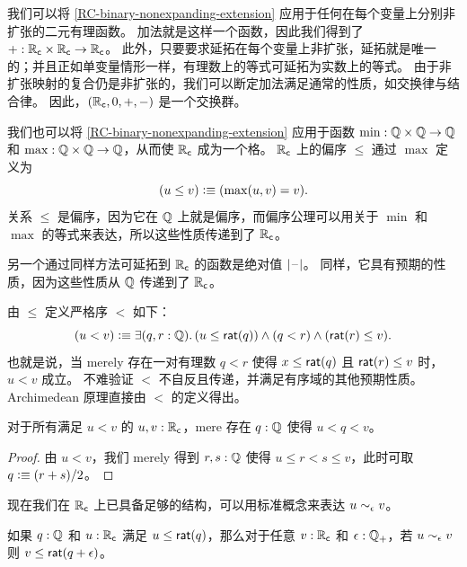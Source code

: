 我们可以将 \cref{RC-binary-nonexpanding-extension} 应用于任何在每个变量上分别非扩张的二元有理函数。
加法就是这样一个函数，因此我们得到了 ${+} : \mathbb{R}_\mathsf{c} \times \mathbb{R}_\mathsf{c} \to \mathbb{R}_\mathsf{c}$。
%
此外，只要要求延拓在每个变量上非扩张，延拓就是唯一的；并且正如单变量情形一样，有理数上的等式可延拓为实数上的等式。
由于非扩张映射的复合仍是非扩张的，我们可以断定加法满足通常的性质，如交换律与结合律。
%
因此，$(\mathbb{R}_\mathsf{c}, 0, {+}, {-})$ 是一个交换群。

我们也可以将 \cref{RC-binary-nonexpanding-extension} 应用于函数 $\min : \mathbb{Q} \times
\mathbb{Q} \to \mathbb{Q}$ 和 $\max : \mathbb{Q} \times \mathbb{Q} \to \mathbb{Q}$，从而使 $\RC$ 成为一个格。
$\RC$ 上的偏序 $\leq$ 通过 $\max$ 定义为
%
%
%
\begin{equation*}
  (u \leq v) \vcentcolon\equiv (\max(u, v) = v).
\end{equation*}
%
关系 $\leq$ 是偏序，因为它在 $\mathbb{Q}$ 上就是偏序，而偏序公理可以用关于 $\min$ 和 $\max$ 的等式来表达，所以这些性质传递到了 $\RC$。

%
另一个通过同样方法可延拓到 $\RC$ 的函数是绝对值 $|{\mathord{\hspace{1pt}\text{--}\hspace{1pt}}}|$。
同样，它具有预期的性质，因为这些性质从 $\mathbb{Q}$ 传递到了 $\RC$。

由 $\leq$ 定义严格序 $<$ 如下：
%
%
%
\begin{equation*}
  (u < v) \defeq \exis{q, r : \Q} (u \leq \rcrat(q)) \land (q < r) \land (\rcrat(r) \leq v).
\end{equation*}
%
也就是说，当 merely 存在一对有理数 $q < r$ 使得 $x \leq
\mathsf{rat}(q)$ 且 $\mathsf{rat}(r) \leq v$ 时，$u < v$ 成立。
不难验证 $<$ 不自反且传递，并满足有序域的其他预期性质。
Archimedean 原理直接由 $<$ 的定义得出。

%


\begin{thm}[$\RC$ 的Archimedean 原理] \label{RC-archimedean}
  对于所有满足 $u < v$ 的 $u, v : \mathbb{R}_\mathsf{c}$，mere 存在 $q : \mathbb{Q}$ 使得 $u < q < v$。
\end{thm}

\begin{proof}
  由 $u < v$，我们 merely 得到 $r, s : \mathbb{Q}$ 使得 $u \leq r < s \leq v$，此时可取 $q
  \vcentcolon\equiv (r + s) / 2$。
\end{proof}

现在我们在 $\RC$ 上已具备足够的结构，可以用标准概念来表达 $u \sim_{\epsilon} v$。

\begin{lem}\label{thm:RC-le-grow}
  如果 $q:\mathbb{Q}$ 和 $u:\mathbb{R}_\mathsf{c}$ 满足 $u\le \mathsf{rat}(q)$，那么对于任意 $v:\mathbb{R}_\mathsf{c}$ 和 $\epsilon:\mathbb{Q}_{+}$，若 $u\sim_{\epsilon} v$ 则 $v\le \mathsf{rat}(q+\epsilon)$。
\end{lem}

